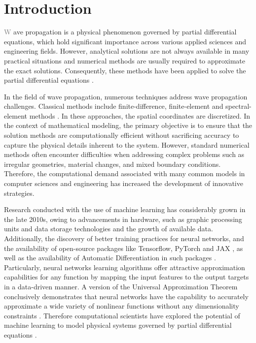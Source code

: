 \documentclass[11pt,twoside]{article}
\begin{document}
\section*{Introduction}

\lettrine{\textcolor{gray}{W}}{ }ave propagation is a physical phenomenon governed by partial differential equations, 
which hold significant importance across various applied sciences and engineering fields. However, analytical 
solutions are not always available in many practical situations and numerical methods are usually required to 
approximate the exact solutions. Consequently, these methods have been applied to solve the partial differential 
equations \citep{Seriani2020}.

In the field of wave propagation, numerous techniques address wave propagation challenges. Classical methods include 
finite-difference, finite-element and spectral-element methods \citep{Moczo, virieux_review_2011, Igel2017,
komatitsch_introduction_1999,chaljub_spectral-element_2007}. In these approaches, the spatial coordinates are discretized. 
In the context of mathematical modeling, the primary objective is to ensure that the solution methods 
are computationally efficient without sacrificing accuracy to capture the physical details inherent to the 
system. However, standard numerical methods often encounter difficulties when addressing complex problems 
such as irregular geometries, material changes, and mixed boundary conditions. Therefore, the computational 
demand associated with many common models in computer sciences and engineering has increased the development 
of innovative strategies.

Research conducted with the use of machine learning has considerably grown in the late 2010s, owing to advancements 
in hardware, such as graphic processing units and data storage technologies and the growth of available data. 
Additionally, the discovery of better training practices for neural networks, and the availability of open-source 
packages like Tensorflow, PyTorch and JAX \citep{abadi_tensorflow_2016,paszke_pytorch_2019,jax2018github}, as well 
as the availability of Automatic Differentiation in such packages \citep{paszke_automatic_2017,baydin_automatic_2017}. 
Particularly, neural networks learning algorithms offer attractive approximation capabilities for any function by 
mapping the input features to the output targets in a data-driven manner. A version of the Universal Approximation 
Theorem conclusively demonstrates that neural networks have the capability to accurately approximate a wide 
variety of nonlinear functions without any dimensionality constraints \citep{barron_universal_1993}. Therefore 
computational scientists have explored the potential of machine learning to model physical systems governed 
by partial differential equations \citep{cuomo_scientific_2022,karniadakis_physics-informed_2021}. 
\end{document}
